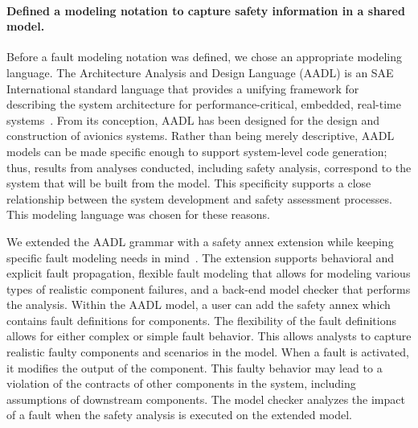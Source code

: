 \paragraph{Defined a modeling notation to capture safety information in a shared model.}
Before a fault modeling notation was defined, we chose an appropriate modeling language. The Architecture Analysis and Design Language (AADL) is an SAE International standard language that provides a unifying framework for describing the system architecture for performance-critical, embedded, real-time systems~\cite{AADL_Standard,FeilerModelBasedEngineering2012}. From its conception, AADL has been designed for the design and construction of avionics systems.  Rather than being merely descriptive, AADL models can be made specific enough to support system-level code generation; thus, results from analyses conducted, including safety analysis, correspond to the system that will be built from the model.  This specificity supports a close relationship between the system development and safety assessment processes. This modeling language was chosen for these reasons. 

We extended the AADL grammar with a safety annex extension while keeping specific fault modeling needs in mind~\cite{Stewart17:IMBSA, stewart2020safety}. The extension supports behavioral and explicit fault propagation, flexible fault modeling that allows for modeling various types of realistic component failures, and a back-end model checker that performs the analysis.  Within the AADL model, a user can add the safety annex which contains fault definitions for components. The flexibility of the fault definitions allows for either complex or simple fault behavior. This allows analysts to capture realistic faulty components and scenarios in the model. When a fault is activated, it modifies the output of the component. This faulty behavior may lead to a violation of the contracts of other components in the system, including assumptions of downstream components. The model checker analyzes the impact of a fault when the safety analysis is executed on the extended model.

